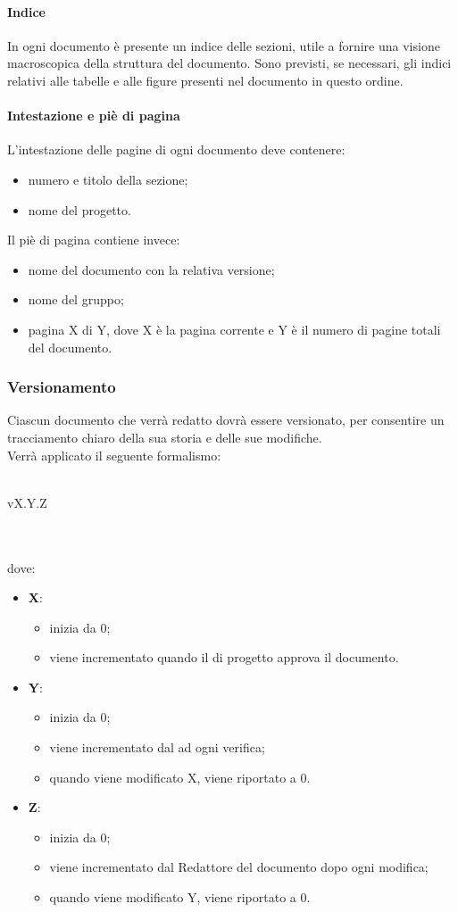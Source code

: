  \paragraph{Indice}
 In ogni documento è presente un indice delle sezioni, utile a fornire una visione macroscopica della struttura del documento. Sono previsti, se necessari, gli indici relativi alle tabelle e alle figure presenti nel documento in questo ordine.
 \paragraph{Intestazione e piè di pagina}
L'intestazione delle pagine di ogni documento deve contenere:
\begin{itemize}
	\item numero e titolo della sezione;
	\item nome del progetto.
\end{itemize} 
Il piè di pagina contiene invece:
\begin{itemize}
	\item nome del documento con la relativa versione;
	\item nome del gruppo;
	\item pagina X di Y, dove X è la pagina corrente e Y è il numero di pagine totali del documento.
\end{itemize} 
\subsubsection{Versionamento}
Ciascun documento che verrà redatto dovrà essere versionato, per consentire un tracciamento chiaro della sua storia e delle sue modifiche.\\Verrà applicato il seguente formalismo:\\ \\ \centerline{vX.Y.Z}\\ \\dove:
\begin{itemize}
	\item \textbf{X}:
	\begin{itemize}
		\item inizia da 0;
		\item viene incrementato quando il \RESP{} di progetto approva il documento.
	\end{itemize}
	\item \textbf{Y}:
	\begin{itemize}
		\item inizia da 0;
		\item viene incrementato dal \VER{} ad ogni verifica;
		\item quando viene modificato X, viene riportato a 0.
	\end{itemize}
	\item \textbf{Z}:
	\begin{itemize}
		\item inizia da 0;
		\item viene incrementato dal Redattore del documento dopo ogni modifica;
		\item quando viene modificato Y, viene riportato a 0.
	\end{itemize}
\end{itemize}

